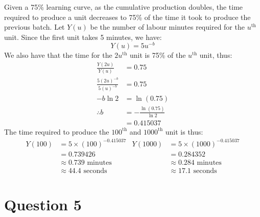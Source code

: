 \documentclass[12pt]{article}
\begin{document}
Given a 75\% learning curve, as the cumulative production doubles, the time required to produce a unit decreases to 75\% of the time it took to produce the previous batch. Let $Y(u)$ be the number of labour minutes required for the $u^{\text{th}}$ unit. Since the first unit takes 5 minutes, we have: \begin{equation*}
    Y(u) = 5 u^{-b}
\end{equation*} We also have that the time for the $2u^{\text{th}}$ unit is 75\% of the $u^{\text{th}}$ unit, thus: \begin{align*}
    \frac{Y(2u)}{Y(u)} &= 0.75 \\ 
    \frac{5(2u)^{-b}}{5(u)^{-b}} &= 0.75 \\ 
    -b \ln 2 &= \ln (0.75) \\ 
    \therefore b &= - \frac{\ln (0.75)}{\ln 2} \\ 
    &= 0.415037
\end{align*} The time required to produce the $100^{\text{th}}$ and $1000^{\text{th}}$ unit is thus: \begin{align*}
    Y(100) &= 5 \times (100)^{-0.415037}  & Y(1000) &= 5 \times (1000)^{-0.415037} \\ 
    &= 0.739426 & &= 0.284352 \\ 
    &\approx \boxed{0.739 \text{ minutes}} & &\approx \boxed{0.284 \text{ minutes}} \\ 
    &\approx 44.4 \text{ seconds} & &\approx 17.1 \text{ seconds}
\end{align*} 

\newpage 

\section*{Question 5}

% 
% 
%  
% 
% 
%  
% 
% 
% 
\end{document}

